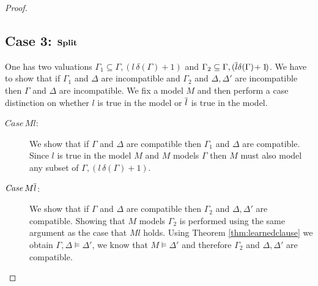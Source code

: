 \begin{mytheorem}
\begin{proof}
\subsection*{Case 3: $\mathbf{Split}$}
One has two valuations $\Gamma_1 \subseteq \Gamma, (l \, \delta(\Gamma) \! + 1 \!)$ and $\Gamma_2 \subseteq \Gamma, (\overline{l} \delta(\Gamma) \! + 1 \!)$. We have to show that if  $\Gamma_1$ and $\Delta$ are incompatible  and  $\Gamma_2$ and $\Delta, \Delta'$ are incompatible then $\Gamma$ and $\Delta$ are incompatible. We fix a model $M$ and then perform a case distinction on whether $l$ is true in the model or $\overline{l}$ is true in the model.
 \begin{description}
	\item[$\mathit{Case} \, M l$:] We show that if $\Gamma$ and $\Delta$ are compatible then $\Gamma_1$ and $\Delta$ are compatible. Since $l$ is true in the model $M$ and $M$ models $\Gamma$ then $M$ must also model any subset of $\Gamma,(l \, \delta(\Gamma) \! + \!1)$.
%	
\item [$\mathit{Case}\, M  \overline{l}$:] We show that if  $\Gamma$ and $\Delta$ are compatible then $\Gamma_2$ and $\Delta, \Delta'$ are compatible.  Showing that $M$ models $\Gamma_2$ is performed using the same argument as the case that $M l$ holds. Using Theorem \ref{thm:learnedclause} we obtain $\Gamma,\Delta \models \Delta'$, we know that $M \models \Delta'$ and therefore $\Gamma_2$ and $\Delta, \Delta'$ are compatible.
\end{description}
\end{proof}
%
\end{mytheorem}


